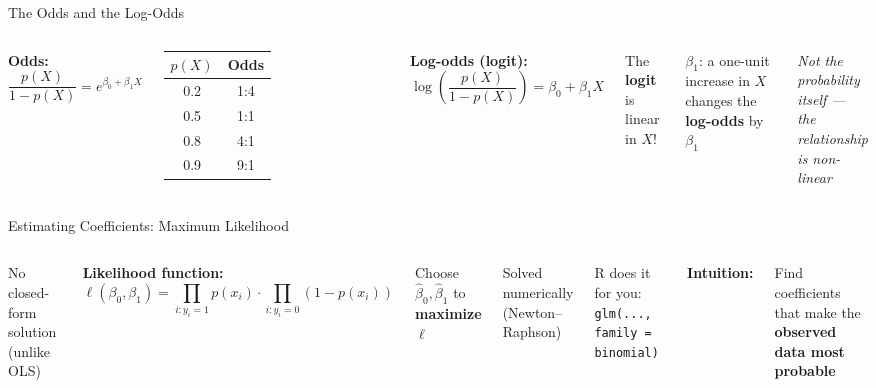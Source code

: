 \documentclass[aspectratio=169, 11pt]{beamer}
\begin{document}
\begin{frame}{The Odds and the Log-Odds}
\begin{columns}
\textbf{Odds:}
$$\frac{p(X)}{1 - p(X)} = e^{\beta_0 + \beta_1 X}$$

\begin{tabular}{cc}
\toprule
$p(X)$ & Odds \\
\midrule
0.2 & 1:4 \\
0.5 & 1:1 \\
0.8 & 4:1 \\
0.9 & 9:1 \\
\bottomrule
\end{tabular}

\textbf{Log-odds (logit):}
$$\log\left(\frac{p(X)}{1 - p(X)}\right) = \beta_0 + \beta_1 X$$

\vspace{0.3em}
The \textbf{logit} is linear in $X$!

\vspace{0.5em}
$\beta_1$: a one-unit increase in $X$ changes the \textbf{log-odds} by $\beta_1$

\vspace{0.3em}
\textit{Not the probability itself ---\\the relationship is non-linear}
\end{columns}
\end{frame}


\begin{frame}{Estimating Coefficients: Maximum Likelihood}
\begin{columns}
No closed-form solution (unlike OLS)

\vspace{0.3em}
\textbf{Likelihood function:}
$$\ell(\beta_0, \beta_1) = \prod_{i: y_i = 1} p(x_i) \cdot \prod_{i: y_i = 0} (1 - p(x_i))$$

\vspace{0.3em}
Choose $\hat{\beta}_0, \hat{\beta}_1$ to \textbf{maximize} $\ell$

\vspace{0.3em}
Solved numerically (Newton--Raphson)

\vspace{0.3em}
R does it for you: \texttt{glm(..., family = binomial)}

\textbf{Intuition:}

\vspace{0.3em}
Find coefficients that make the \textbf{observed data most probable}

\vspace{0.5em}
\end{columns}
\end{frame}
\end{document}
